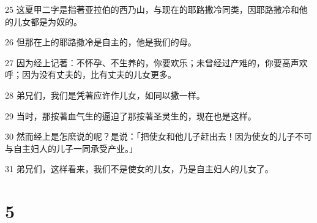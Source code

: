 \par 25 这夏甲二字是指著亚拉伯的西乃山，与现在的耶路撒冷同类，因耶路撒冷和他的儿女都是为奴的。
\par 26 但那在上的耶路撒冷是自主的，他是我们的母。
\par 27 因为经上记著：不怀孕、不生养的，你要欢乐；未曾经过产难的，你要高声欢呼；因为没有丈夫的，比有丈夫的儿女更多。
\par 28 弟兄们，我们是凭著应许作儿女，如同以撒一样。
\par 29 当时，那按著血气生的逼迫了那按著圣灵生的，现在也是这样。
\par 30 然而经上是怎麽说的呢？是说：「把使女和他儿子赶出去！因为使女的儿子不可与自主妇人的儿子一同承受产业。」
\par 31 弟兄们，这样看来，我们不是使女的儿女，乃是自主妇人的儿女了。

\chapter{5}

